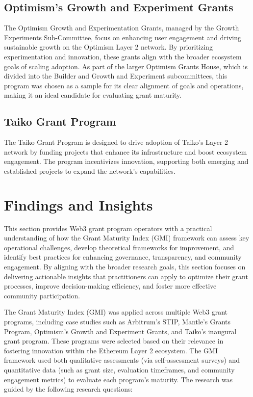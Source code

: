 \documentclass[a4,10pt]{article}
\begin{document}
\subsection{Optimism’s Growth and Experiment Grants}\label{sec_6.3}
The Optimism Growth and Experimentation Grants, managed by the Growth Experiments Sub-Committee, focus on enhancing user engagement and driving sustainable growth on the Optimism Layer 2 network. By prioritizing experimentation and innovation, these grants align with the broader ecosystem goals of scaling adoption. As part of the larger Optimism Grants House, which is divided into the Builder and Growth and Experiment subcommittees, this program was chosen as a sample for its clear alignment of goals and operations, making it an ideal candidate for evaluating grant maturity.

\subsection{Taiko Grant Program}\label{sec_6.4}
The Taiko Grant Program is designed to drive adoption of Taiko's Layer 2 network by funding projects that enhance its infrastructure and boost ecosystem engagement. The program incentivizes innovation, supporting both emerging and established projects to expand the network’s capabilities. 

\section{Findings and Insights}\label{sec_7}
This section provides Web3 grant program operators with a practical understanding of how the Grant Maturity Index (GMI) framework can assess key operational challenges, develop theoretical frameworks for improvement, and identify best practices for enhancing governance, transparency, and community engagement. By aligning with the broader research goals, this section focuses on delivering actionable insights that practitioners can apply to optimize their grant processes, improve decision-making efficiency, and foster more effective community participation.

The Grant Maturity Index (GMI) was applied across multiple Web3 grant programs, including case studies such as Arbitrum's STIP, Mantle’s Grants Program, Optimism's Growth and Experiment Grants, and Taiko’s inaugural grant program. These programs were selected based on their relevance in fostering innovation within the Ethereum Layer 2 ecosystem. The GMI framework used both qualitative assessments (via self-assessment surveys) and quantitative data (such as grant size, evaluation timeframes, and community engagement metrics) to evaluate each program's maturity. The research was guided by the following research questions:
\end{document}
